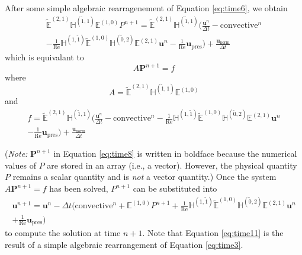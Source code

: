 After some simple algebraic rearragenement of Equation \eqref{eq:time6}, we obtain
\begin{multline}
    \label{eq:time7}
    \tilde{\mathbb{E}}^{(2,1)} \mathbb{H}^{(\tilde{1},1)} \mathbb{E}^{(1,0)} P^{n+1} = \tilde{\mathbb{E}}^{(2,1)} \mathbb{H}^{(\tilde{1},1)} \biggl( \frac{\mathbf{u}^{n}}{\Delta t} - \text{convective}^{n} \\
    - \frac{1}{\text{Re}} \mathbb{H}^{(1,\tilde{1})} \tilde{\mathbb{E}}^{(1,0)} \mathbb{H}^{(\tilde{0},2)} \mathbb{E}^{(2,1)} \mathbf{u}^{n} - \frac{1}{\text{Re}} \mathbf{u}_{\text{pres}} \biggr) + \frac{\mathbf{u}^{}_{\text{norm}}}{\Delta t}
\end{multline}
which is equivalant to
\begin{equation}
    \label{eq:time8}
    A \mathbf{P}^{n+1} = f
\end{equation}
where
\begin{equation}
    \label{eq:time9}
    A = \tilde{\mathbb{E}}^{(2,1)} \mathbb{H}^{(\tilde{1},1)} \mathbb{E}^{(1,0)}
\end{equation}
and
\begin{multline}
    \label{eq:time10}
    f = \tilde{\mathbb{E}}^{(2,1)} \mathbb{H}^{(\tilde{1},1)} \biggl( \frac{\mathbf{u}^{n}}{\Delta t} - \text{convective}^{n} - \frac{1}{\text{Re}} \mathbb{H}^{(1,\tilde{1})} \tilde{\mathbb{E}}^{(1,0)} \mathbb{H}^{(\tilde{0},2)} \mathbb{E}^{(2,1)} \mathbf{u}^{n} \\
    - \frac{1}{\text{Re}} \mathbf{u}_{\text{pres}} \biggr) + \frac{\mathbf{u}^{}_{\text{norm}}}{\Delta t}
\end{multline}

(\textit{Note:} $\mathbf{P}^{n+1}$ in Equation \eqref{eq:time8} is written in boldface  because the numerical values of $P$ are stored in an array (i.e., a vector). However, the physical quantity $P$ remains a scalar quantity and is \emph{not} a vector quantity.) Once the system $A \mathbf{P}^{n+1} = f$ has been solved, $P^{n+1}$ can be substituted into
\begin{multline}
    \label{eq:time11}
    \mathbf{u}^{n+1} = \mathbf{u}^{n} - \Delta t \biggl( \text{convective}^{n} + \mathbb{E}^{(1,0)} P^{n+1} + \frac{1}{\text{Re}} \mathbb{H}^{(1,\tilde{1})} \tilde{\mathbb{E}}^{(1,0)} \mathbb{H}^{(\tilde{0},2)} \mathbb{E}^{(2,1)} \mathbf{u}^{n} \\
    + \frac{1}{\text{Re}} \mathbf{u}_{\text{pres}} \biggr)
\end{multline}
to compute the solution at time $n + 1$. Note that Equation \eqref{eq:time11} is the result of a simple algebraic rearrangement of Equation \eqref{eq:time3}.